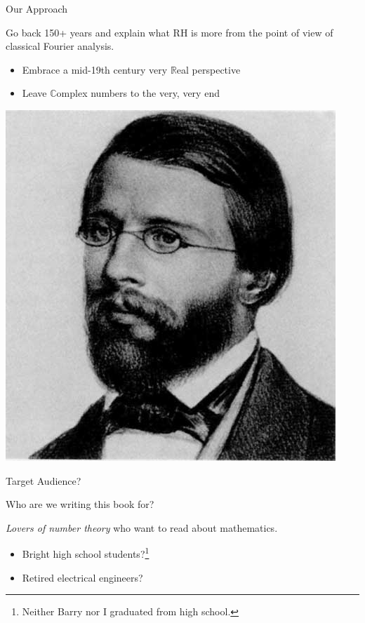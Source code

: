 \documentclass{beamer}
\begin{document}
\begin{frame}{Our Approach}
  \begin{block}{}
    Go back 150+ years and explain what RH is more from the point of view of  classical Fourier analysis.
    \begin{itemize}
      \item Embrace a mid-19th century very $\mathbb{R}$eal perspective
      \item Leave $\mathbb{C}$omplex numbers to the very, very end
    \end{itemize}
  \end{block}
  \begin{center}
    \includegraphics[height=.5\textheight]{pics/riemann}
  \end{center}

\end{frame}


\begin{frame}{Target Audience?}

  \begin{block}{Who are we writing this book for?}
    \vspace{.25in}

    {\em Lovers of number theory} who want to read about mathematics.
    \vspace{.25in}

    \begin{itemize}
      \item Bright high school students?\footnote{Neither Barry nor I  graduated from high school.}
      \item Retired electrical engineers?
    \end{itemize}
    \vspace{.5in}

  \end{block}

\end{frame}
\end{document}
